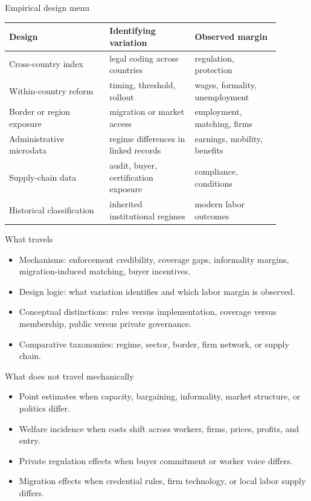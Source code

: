 \documentclass[aspectratio=169,11pt]{beamer}
\begin{document}
\begin{frame}{Empirical design menu}
\small
\begin{tabular}{p{0.33\linewidth} p{0.28\linewidth} p{0.28\linewidth}}
\toprule
Design & Identifying variation & Observed margin \\
\midrule
Cross-country index & legal coding across countries & regulation, protection \\
Within-country reform & timing, threshold, rollout & wages, formality, unemployment \\
Border or region exposure & migration or market access & employment, matching, firms \\
Administrative microdata & regime differences in linked records & earnings, mobility, benefits \\
Supply-chain data & audit, buyer, certification exposure & compliance, conditions \\
Historical classification & inherited institutional regimes & modern labor outcomes \\
\bottomrule
\end{tabular}
\end{frame}

\begin{frame}{What travels}
\begin{itemize}
    \item Mechanisms: enforcement credibility, coverage gaps, informality margins, migration-induced matching, buyer incentives.
    \item Design logic: what variation identifies and which labor margin is observed.
    \item Conceptual distinctions: rules versus implementation, coverage versus membership, public versus private governance.
    \item Comparative taxonomies: regime, sector, border, firm network, or supply chain.
\end{itemize}
\end{frame}

\begin{frame}{What does not travel mechanically}
\begin{itemize}
    \item Point estimates when capacity, bargaining, informality, market structure, or politics differ.
    \item Welfare incidence when costs shift across workers, firms, prices, profits, and entry.
    \item Private regulation effects when buyer commitment or worker voice differs.
    \item Migration effects when credential rules, firm technology, or local labor supply differs.
\end{itemize}
\end{frame}
\end{document}
